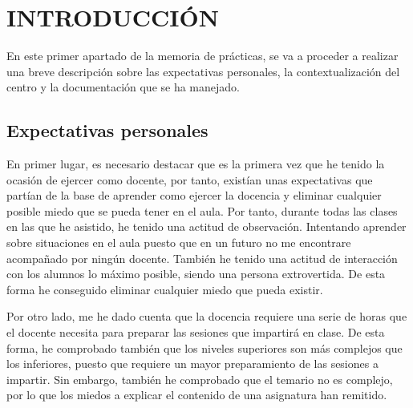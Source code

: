 \documentclass[spanish,12pt, a4paper,twoside]{paper}
\let\oldsection\section
\def\section{\cleardoublepage\oldsection}
\newcommand\blankpage{%
\null
\thispagestyle{empty}%
\addtocounter{page}{-1}%
\newpage}
\begin{document}
\afterpage{\blankpage}



\setlength{\parskip}{8pt} %

\afterpage{\blankpage}


\tableofcontents %


\newpage
{} 


\section{INTRODUCCIÓN} %

En este primer apartado de la memoria de prácticas, se va a proceder a realizar una breve descripción sobre las expectativas personales, la contextualización del centro y la documentación que se ha manejado.

\subsection{Expectativas personales}
En primer lugar, es necesario destacar que es la primera vez que he tenido la ocasión de ejercer como docente, por tanto, existían unas expectativas que partían de la base de aprender como ejercer la docencia y eliminar cualquier posible miedo que se pueda tener en el aula. Por tanto, durante todas las clases en las que he asistido, he tenido una actitud de observación. Intentando aprender sobre situaciones en el aula puesto que en un futuro no me encontrare acompañado por ningún docente. También he tenido una actitud de interacción con los alumnos lo máximo posible, siendo una persona extrovertida. De esta forma he conseguido eliminar cualquier miedo que pueda existir.

Por otro lado, me he dado cuenta que la docencia requiere una serie de horas que el docente necesita para preparar las sesiones que impartirá en clase. De esta forma, he comprobado también que los niveles superiores son más complejos que los inferiores, puesto que requiere un mayor preparamiento de las sesiones a impartir. Sin embargo, también he comprobado que el temario no es complejo, por lo que los miedos a explicar el contenido de una asignatura han remitido.
\end{document}
